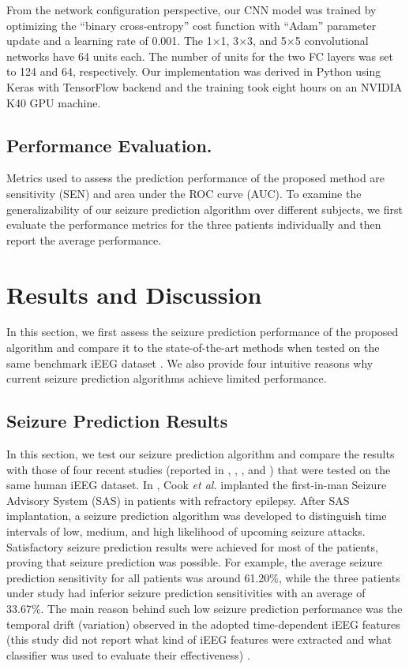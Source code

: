 \documentclass[journal]{IEEEtran}
\begin{document}
From the network configuration perspective, our CNN model was trained by optimizing the ``binary cross-entropy'' cost function with ``Adam'' parameter update and a learning rate of 0.001. The 1$\times$1, 3$\times$3, and 5$\times$5 convolutional networks have 64 units each. The number of units for the two FC layers was set to 124 and 64, respectively. Our implementation was derived in Python using Keras with TensorFlow backend and the training took eight hours on an NVIDIA K40 GPU machine.

\subsection{Performance Evaluation.}

Metrics used to assess the prediction performance of the proposed method are sensitivity (SEN) and area under the ROC curve (AUC). To examine the generalizability of our seizure prediction algorithm over different subjects, we first evaluate the performance metrics for the three patients individually and then report the average performance.



\section{Results and Discussion}
\label{Section4}

In this section, we first assess the seizure prediction performance of the proposed algorithm and compare it to the state-of-the-art methods when tested on the same benchmark iEEG dataset \cite{cook2013prediction}. We also provide four intuitive reasons why current seizure prediction algorithms achieve limited performance.



\subsection{Seizure Prediction Results}

In this section, we test our seizure prediction algorithm and compare the results with those of four recent studies (reported in \cite{cook2013prediction}, \cite{karoly2016interictal}, \cite{karoly2017circadian}, and \cite{kiral2018epileptic}) that were tested on the same human iEEG dataset. In \cite{cook2013prediction}, Cook \textit{et al.} implanted the first-in-man Seizure Advisory System (SAS) in patients with refractory epilepsy. After SAS implantation, a seizure prediction algorithm was developed to distinguish time intervals of low, medium, and high likelihood of upcoming seizure attacks. Satisfactory seizure prediction results were achieved for most of the patients, proving that seizure prediction was possible. For example, the average seizure prediction sensitivity for all patients was around 61.20\%, while the three patients under study had inferior seizure prediction sensitivities with an average of 33.67\%.
The main reason behind such low seizure prediction performance was the temporal drift (variation) observed in the adopted time-dependent iEEG features (this study did not report what kind of iEEG features were extracted and what classifier was used to evaluate their effectiveness) \cite{cook2013prediction}.      
\end{document}
